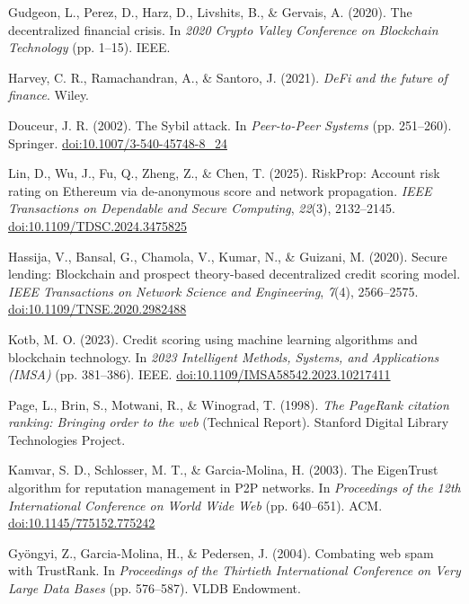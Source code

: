 \begin{enumerate}[label={[\arabic*]}, leftmargin=*, itemsep=0.35em, parsep=0pt]
  \item{}\label{ref:9} Gudgeon, L., Perez, D., Harz, D., Livshits, B., \& Gervais, A. (2020). The decentralized financial crisis. In \textit{2020 Crypto Valley Conference on Blockchain Technology} (pp. 1--15). IEEE.
  \item{}\label{ref:10} Harvey, C. R., Ramachandran, A., \& Santoro, J. (2021). \textit{DeFi and the future of finance}. Wiley.
  \item{}\label{ref:11} Douceur, J. R. (2002). The Sybil attack. In \textit{Peer-to-Peer Systems} (pp. 251--260). Springer. \href{https://doi.org/10.1007/3-540-45748-8_24}{doi:10.1007/3-540-45748-8\_24}
  \item{}\label{ref:12} Lin, D., Wu, J., Fu, Q., Zheng, Z., \& Chen, T. (2025). RiskProp: Account risk rating on Ethereum via de-anonymous score and network propagation. \textit{IEEE Transactions on Dependable and Secure Computing}, \textit{22}(3), 2132--2145. \href{https://doi.org/10.1109/TDSC.2024.3475825}{doi:10.1109/TDSC.2024.3475825}
  \item{}\label{ref:13} Hassija, V., Bansal, G., Chamola, V., Kumar, N., \& Guizani, M. (2020). Secure lending: Blockchain and prospect theory-based decentralized credit scoring model. \textit{IEEE Transactions on Network Science and Engineering}, \textit{7}(4), 2566--2575. \href{https://doi.org/10.1109/TNSE.2020.2982488}{doi:10.1109/TNSE.2020.2982488}
  \item{}\label{ref:14} Kotb, M. O. (2023). Credit scoring using machine learning algorithms and blockchain technology. In \textit{2023 Intelligent Methods, Systems, and Applications (IMSA)} (pp. 381--386). IEEE. \href{https://doi.org/10.1109/IMSA58542.2023.10217411}{doi:10.1109/IMSA58542.2023.10217411}
  \item{}\label{ref:15} Page, L., Brin, S., Motwani, R., \& Winograd, T. (1998). \textit{The PageRank citation ranking: Bringing order to the web} (Technical Report). Stanford Digital Library Technologies Project.
  \item{}\label{ref:16} Kamvar, S. D., Schlosser, M. T., \& Garcia-Molina, H. (2003). The EigenTrust algorithm for reputation management in P2P networks. In \textit{Proceedings of the 12th International Conference on World Wide Web} (pp. 640--651). ACM. \href{https://doi.org/10.1145/775152.775242}{doi:10.1145/775152.775242}
  \item{}\label{ref:17} Gy\"{o}ngyi, Z., Garcia-Molina, H., \& Pedersen, J. (2004). Combating web spam with TrustRank. In \textit{Proceedings of the Thirtieth International Conference on Very Large Data Bases} (pp. 576--587). VLDB Endowment.

\end{enumerate}
